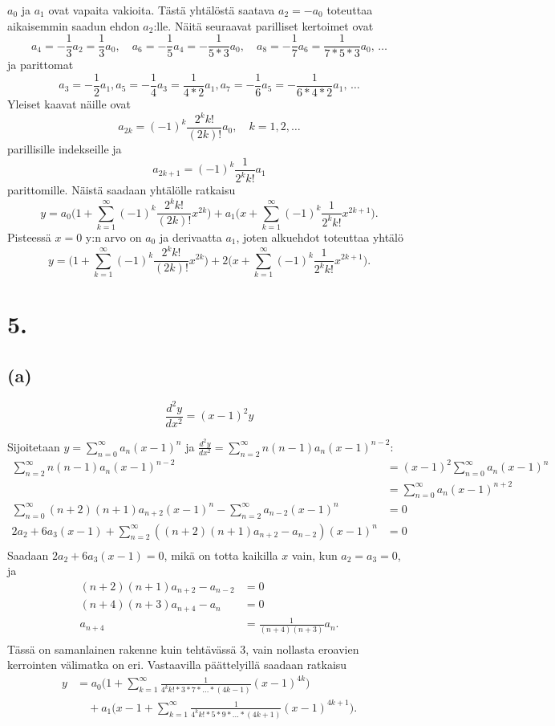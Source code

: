 \documentclass{article}
\begin{document}
$a_0$ ja $a_1$ ovat vapaita vakioita. Tästä yhtälöstä saatava $a_2 = -a_0$
toteuttaa aikaisemmin saadun ehdon $a_2$:lle. Näitä seuraavat parilliset kertoimet ovat
\[
  a_4 = -\frac{1}{3}a_2 = \frac{1}{3}a_0, \quad
  a_6 = -\frac{1}{5}a_4 = -\frac{1}{5*3}a_0, \quad
  a_8 = -\frac{1}{7}a_6 = \frac{1}{7*5*3}a_0,\,\dots
\]
ja parittomat
\[
  a_3 = -\frac{1}{2}a_1,
  a_5 = -\frac{1}{4}a_3 = \frac{1}{4*2}a_1,
  a_7 = -\frac{1}{6}a_5 = -\frac{1}{6*4*2}a_1,\,\dots
\]
Yleiset kaavat näille ovat
\[
  a_{2k} = (-1)^k \frac{2^kk!}{(2k)!}a_0, \quad k = 1,2,\dots
\]
parillisille indekseille ja
\[
  a_{2k+1} = (-1)^k \frac{1}{2^kk!}a_1
\]
parittomille. Näistä saadaan yhtälölle ratkaisu
\[
  y = a_0\Big(1 + \sum_{k=1}^{\infty} (-1)^k \frac{2^kk!}{(2k)!}x^{2k}\Big)
  + a_1\Big(x + \sum_{k=1}^{\infty} (-1)^k \frac{1}{2^kk!}x^{2k+1} \Big).
\]
Pisteessä $x = 0$ y:n arvo on $a_0$ ja derivaatta $a_1$, joten alkuehdot
toteuttaa yhtälö
\[
  y = \Big(1 + \sum_{k=1}^{\infty} (-1)^k \frac{2^kk!}{(2k)!}x^{2k}\Big)
  + 2\Big(x + \sum_{k=1}^{\infty} (-1)^k \frac{1}{2^kk!}x^{2k+1} \Big).
\]

\section*{5.}

\subsection*{(a)}

\[
  \frac{d^2 y}{d x^2} = (x-1)^2y
\]

Sijoitetaan $y = \sum_{n=0}^{\infty} a_n(x-1)^n$ ja $\frac{d^2 y}{d x^2} =
\sum_{n=2}^{\infty} n(n-1)a_n(x-1)^{n-2}$:
\begin{align*}
  \sum_{n=2}^{\infty} n(n-1)a_n(x-1)^{n-2} &= (x-1)^2 \sum_{n=0}^{\infty} a_n(x-1)^n \\
                                           &= \sum_{n=0}^{\infty} a_n(x-1)^{n+2} \\
  \sum_{n=0}^{\infty} (n+2)(n+1)a_{n+2}(x-1)^{n} - \sum_{n=2}^{\infty} a_{n-2}(x-1)^n &= 0 \\
  2a_2 + 6a_3(x-1) + \sum_{n=2}^{\infty} ((n+2)(n+1)a_{n+2} - a_{n-2})(x-1)^n &= 0 \\
\end{align*}
Saadaan $2a_2 + 6a_3(x-1) = 0$, mikä on totta kaikilla $x$ vain, kun $a_2 = a_3 = 0$,
ja
\begin{align*}
  (n+2)(n+1)a_{n+2} - a_{n-2} &= 0 \\
  (n+4)(n+3)a_{n+4} - a_n &= 0 \\
  a_{n+4} &= \frac{1}{(n+4)(n+3)}a_n. \\
\end{align*}
Tässä on samanlainen rakenne kuin tehtävässä 3, vain nollasta eroavien
kerrointen välimatka on eri. Vastaavilla päättelyillä saadaan ratkaisu
\begin{align*}
  y &= a_0\Big(1 + \sum_{k=1}^{\infty}\frac{1}{4^kk!*3*7*\dots*(4k-1)} (x-1)^{4k}\Big) \\
    &\quad+ a_1\Big(x-1 + \sum_{k=1}^{\infty}\frac{1}{4^kk!*5*9*\dots*(4k+1)} (x-1)^{4k+1}\Big).
\end{align*}
\end{document}
